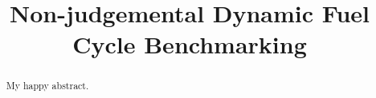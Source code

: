 \documentclass{ntmanuscript}
\title{Non-judgemental Dynamic Fuel Cycle Benchmarking}
\date{}
\begin{document}
\begin{abstract}
My happy abstract.
\end{abstract}











\end{document}
